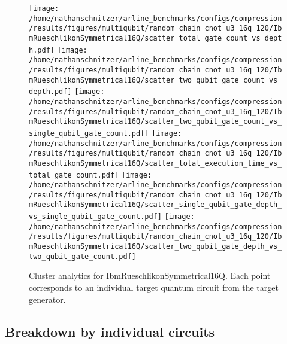 \documentclass{report}%
\begin{document}
\begin{figure}[h!]%
\centering%
\texttt{[image: /home/nathanschnitzer/arline\_benchmarks/configs/compression/results/figures/multiqubit/random\_chain\_cnot\_u3\_16q\_120/IbmRueschlikonSymmetrical16Q/scatter\_total\_gate\_count\_vs\_depth.pdf]}%
\centering%
\texttt{[image: /home/nathanschnitzer/arline\_benchmarks/configs/compression/results/figures/multiqubit/random\_chain\_cnot\_u3\_16q\_120/IbmRueschlikonSymmetrical16Q/scatter\_two\_qubit\_gate\_count\_vs\_depth.pdf]}%
\linebreak%
\centering%
\texttt{[image: /home/nathanschnitzer/arline\_benchmarks/configs/compression/results/figures/multiqubit/random\_chain\_cnot\_u3\_16q\_120/IbmRueschlikonSymmetrical16Q/scatter\_two\_qubit\_gate\_count\_vs\_single\_qubit\_gate\_count.pdf]}%
\centering%
\texttt{[image: /home/nathanschnitzer/arline\_benchmarks/configs/compression/results/figures/multiqubit/random\_chain\_cnot\_u3\_16q\_120/IbmRueschlikonSymmetrical16Q/scatter\_total\_execution\_time\_vs\_total\_gate\_count.pdf]}%
\linebreak%
\centering%
\texttt{[image: /home/nathanschnitzer/arline\_benchmarks/configs/compression/results/figures/multiqubit/random\_chain\_cnot\_u3\_16q\_120/IbmRueschlikonSymmetrical16Q/scatter\_single\_qubit\_gate\_depth\_vs\_single\_qubit\_gate\_count.pdf]}%
\centering%
\texttt{[image: /home/nathanschnitzer/arline\_benchmarks/configs/compression/results/figures/multiqubit/random\_chain\_cnot\_u3\_16q\_120/IbmRueschlikonSymmetrical16Q/scatter\_two\_qubit\_gate\_depth\_vs\_two\_qubit\_gate\_count.pdf]}%
\linebreak%
\caption{Cluster analytics for IbmRueschlikonSymmetrical16Q. Each point corresponds to an individual target
                    quantum circuit from the target generator.}%
\end{figure}

%
\clearpage%
\subsection*{Breakdown by individual circuits }%
\label{subsec:Breakdownbyindividualcircuits}%

%
\end{document}
